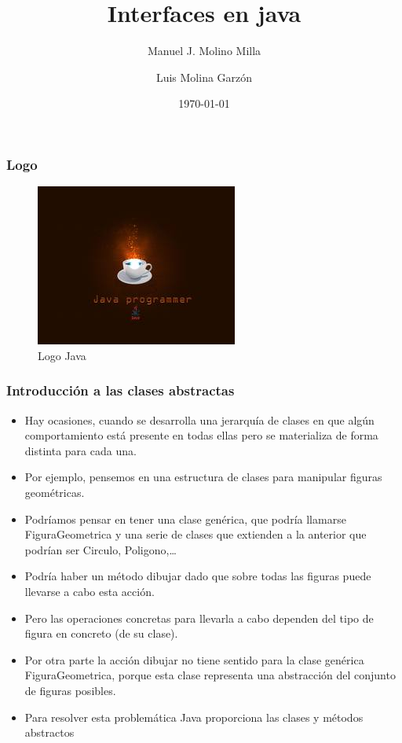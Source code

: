 \documentclass{beamer}
\title{Interfaces en java}
\author{Manuel J. Molino Milla \and Luis Molina Garzón}
\date{\today} %
\institute{IES Virgen del Carmen \and Departamento de Informática}
\begin{document}
\begin{frame}
  \titlepage
\end{frame}

\begin{frame}
    \frametitle{Logo}
\begin{figure}
\includegraphics[scale=1]{imagenes/logo.jpeg} 
\caption{Logo Java}
\end{figure}
\end{frame}





\begin{frame}[fragile]
\frametitle{Introducción a las clases abstractas}
\begin{small}
\begin{itemize}[<+->]
\item Hay ocasiones, cuando se desarrolla una jerarquía de clases en que algún comportamiento está presente en todas ellas pero se materializa de forma distinta para cada una.
\item Por ejemplo, pensemos en una estructura de clases para manipular figuras geométricas.
\item Podríamos pensar en tener una clase genérica, que podría llamarse FiguraGeometrica y una serie de clases que extienden a la anterior que podrían ser Circulo, Poligono,\dots
\item Podría haber un método dibujar dado que sobre todas las figuras puede llevarse a cabo esta acción.
\item Pero las operaciones concretas para llevarla a cabo dependen del tipo de figura en concreto (de su clase).
\item Por otra parte la acción dibujar no tiene sentido para la clase genérica FiguraGeometrica, porque esta clase representa una abstracción del conjunto de figuras posibles.
\item Para resolver esta problemática Java proporciona las clases y métodos abstractos
\end{itemize}
\end{small}
\end{frame}
\end{document}
